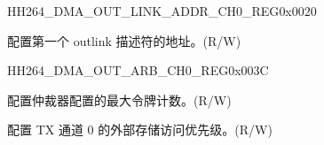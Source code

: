 \begin{register}{H}{H264\_DMA\_OUT\_LINK\_ADDR\_CH0\_REG}{0x0020}\label{regdesc:H264DMAOUTLINKADDRCH0REG}
%
\regnewline%
\begin{regdesc}\begin{reglist}
\label{fielddesc:H264DMAOUTLINKADDRCH0}\item [H264\_DMA\_OUTLINK\_ADDR\_CH0] 配置第一个 outlink 描述符的地址。(R/W)
\end{reglist}\end{regdesc}
\end{register}

\begin{register}{H}{H264\_DMA\_OUT\_ARB\_CH0\_REG}{0x003C}\label{regdesc:H264DMAOUTARBCH0REG}
%
%
%
\regnewline%
\begin{regdesc}\begin{reglist}
\label{fielddesc:H264DMAOUTARBTOKENNUMCH0}\item [H264\_DMA\_OUT\_ARB\_TOKEN\_NUM\_CH0] 配置仲裁器配置的最大令牌计数。(R/W)
\label{fielddesc:H264DMAEXTEROUTARBPRIORITYCH0}\item [H264\_DMA\_EXTER\_OUT\_ARB\_PRIORITY\_CH0] 配置 TX 通道 0 的外部存储访问优先级。(R/W)
\end{reglist}\end{regdesc}
\end{register}


